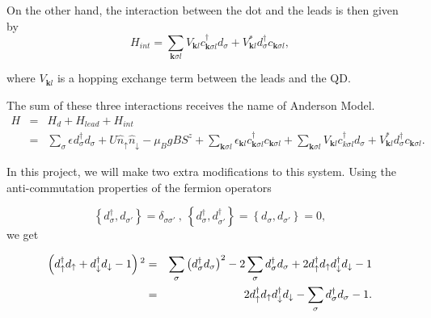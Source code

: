 On the other hand, the interaction between the dot and the leads is then given by 
\begin{equation}
H_{int} = \sum_{\mathbf{k}\sigma l}V_{\mathbf{k}l}c_{\mathbf{k}\sigma l}^{\dagger}d_{\sigma}+V_{\mathbf{k}l}^{*}d_{\sigma}^{\dagger}c_{\mathbf{k}\sigma l},
\end{equation}


\noindent where $V_{\mathbf{k}l}$ is a hopping exchange
term between the leads and the QD. 


The sum of these three interactions receives the name of Anderson Model. 
\begin{eqnarray}
H & = & H_{d}+H_{lead}+H_{int}\nonumber \\
 & = & \sum_{\sigma}\epsilon_{}d_{\sigma}^{\dagger}d_{\sigma}+U\hat{n}_{\uparrow}\hat{n}_{\downarrow}-\mu_{B}gBS^{z}+\sum_{\mathbf{k}\sigma l}\epsilon_{\mathbf{k}l}c_{\mathbf{k}\sigma l}^{\dagger}c_{\mathbf{k}\sigma l}+\sum_{\mathbf{k}\sigma l}V_{\mathbf{k}l}c_{k\sigma l}^{\dagger}d_{\sigma}+V_{\mathbf{k}l}^{*}d_{\sigma}^{\dagger}c_{\mathbf{k}\sigma l}.\label{eq:Anderson}
\end{eqnarray}

In this project, we will make two extra modifications to this system. Using the anti-commutation properties of the fermion operators

\[
\left\{ d_{\sigma}^{\dagger},d_{\sigma'}\right\} =\delta_{\sigma\sigma'}\ ,\ \left\{ d_{\sigma}^{\dagger},d_{\sigma'}^{\dagger}\right\} =\left\{ d_{\sigma},d_{\sigma'}\right\} =0,
\]
\noindent we get


\begin{eqnarray*}
\left(d_{\uparrow}^{\dagger}d_{\uparrow}+d_{\downarrow}^{\dagger}d_{\downarrow}-1\right){}^{2} & = & \sum_{\sigma}\left(d_{\sigma}^{\dagger}d_{\sigma}\right)^{2}-2\sum_{\sigma}d_{\sigma}^{\dagger}d_{\sigma}+2d_{\uparrow}^{\dagger}d_{\uparrow}d_{\downarrow}^{\dagger}d_{\downarrow}-1\\
 & = & 2d_{\uparrow}^{\dagger}d_{\uparrow}d_{\downarrow}^{\dagger}d_{\downarrow}-\sum_{\sigma}d_{\sigma}^{\dagger}d_{\sigma}-1.
\end{eqnarray*}

